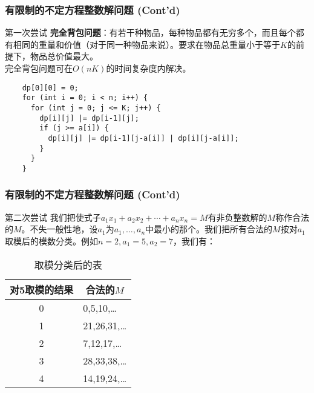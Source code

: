 \documentclass[hyperref={unicode=true}]{beamer}
\begin{document}
  \begin{frame}[fragile]\frametitle{有限制的不定方程整数解问题 (Cont'd)}
    \begin{alertblock}{第一次尝试}
      {\bf 完全背包问题}：有若干种物品，每种物品都有无穷多个，而且每个都有相同的重量和价值（对于同一种物品来说）。要求在物品总重量小于等于$K$的前提下，物品总价值最大。\\
      完全背包问题可在$O(nK)$的时间复杂度内解决。\\
      \begin{verbatim}
    dp[0][0] = 0;
    for (int i = 0; i < n; i++) {
      for (int j = 0; j <= K; j++) {
        dp[i][j] |= dp[i-1][j];
        if (j >= a[i]) {
          dp[i][j] |= dp[i-1][j-a[i]] | dp[i][j-a[i]];
        }
      }
    }
      \end{verbatim}
    \end{alertblock}
  \end{frame}
  \begin{frame}[fragile]\frametitle{有限制的不定方程整数解问题 (Cont'd)}
    \begin{alertblock}{第二次尝试}
      我们把使式子$a_1x_1+a_2x_2+ \cdots + a_n x_n=M$有非负整数解的$M$称作合法的$M$。不失一般性地，设$a_1$为$a_1,\ldots,a_n$中最小的那个。我们把所有合法的$M$按对$a_1$取模后的模数分类。例如$n=2,a_1=5,a_2=7$，我们有：
      \begin{table}[H]
        \centering
        \caption{取模分类后的表}\label{table:div}
        \begin{tabular}{c@{}ccc}
          \toprule
          对5取模的结果 & \multicolumn{3}{|c}{合法的$M$}          \\ \midrule
          0       & \multicolumn{3}{|l}{0,5,10,\ldots}   \\
          1       & \multicolumn{3}{|l}{21,26,31,\ldots} \\
          2       & \multicolumn{3}{|l}{7,12,17,\ldots}  \\
          3       & \multicolumn{3}{|l}{28,33,38,\ldots} \\
          4       & \multicolumn{3}{|l}{14,19,24,\ldots}  \\ \bottomrule
        \end{tabular}
      \end{table}
    \end{alertblock}
  \end{frame}
\end{document}
